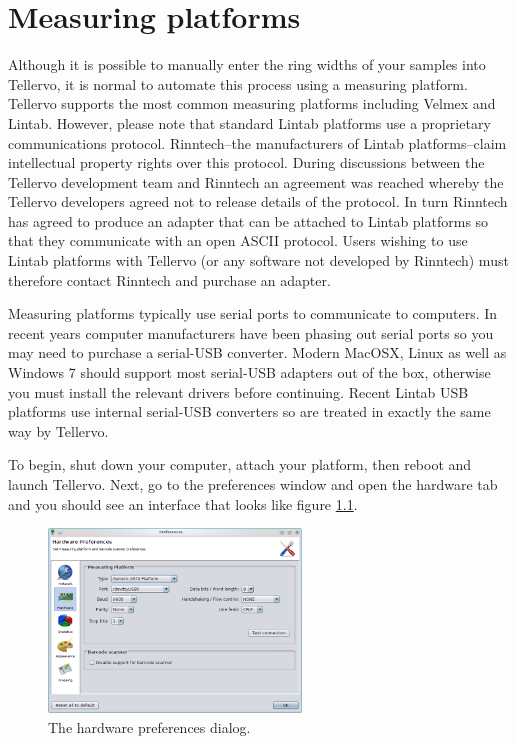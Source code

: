 \chapter{Measuring platforms}
\label{txt:MeasuringPlatformConfig}

Although it is possible to manually enter the ring widths of your samples into Tellervo, it is normal to automate this process using a measuring platform. Tellervo supports the most common measuring platforms including Velmex and Lintab.  However, please note that standard Lintab platforms use a proprietary communications protocol. Rinntech--the manufacturers of Lintab platforms--claim intellectual property rights over this protocol. During discussions between the Tellervo development team and Rinntech an agreement was reached whereby the Tellervo developers agreed not to release details of the protocol. In turn Rinntech has agreed to produce an adapter that can be attached to Lintab platforms so that they communicate with an open ASCII protocol. Users wishing to use Lintab platforms with Tellervo (or any software not developed by Rinntech) must therefore contact Rinntech and purchase an adapter.

Measuring platforms typically use serial ports to communicate to computers. In recent years computer manufacturers have been phasing out serial ports so you may need to purchase a serial-USB converter. Modern MacOSX, Linux as well as Windows 7 should support most serial-USB adapters out of the box, otherwise you must install the relevant drivers before continuing.  Recent Lintab USB platforms use internal serial-USB converters so are treated in exactly the same way by Tellervo.

To begin, shut down your computer, attach your platform, then reboot and launch Tellervo. Next, go to the preferences window and open the hardware tab and you should see an interface that looks like figure \ref{fig:hardwareprefs}.

\begin{figure}[hbtp]
  \centering
    \includegraphics[width=0.6\textwidth]{Images/hardwareprefs.png}
    \caption{The hardware preferences dialog.}
    \label{fig:hardwareprefs}
\end{figure}

